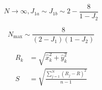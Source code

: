 \documentclass[10pt,aspectratio=43,mathserif,table]{beamer}
\begin{document}
\begin{frame}
    $$
    N\rightarrow \infty , J_{1a}\sim J_{1b}\sim 2-\frac{8}{1-J_2}
    $$

    $$
    N_{\max}\sim \frac{8}{\left( 2-J_1 \right) \left( 1-J_2 \right)}
    $$


\end{frame}

\begin{frame}
    $$
    \begin{aligned}
        R_k&=\sqrt{\hat{x}_{k}^{2}+\hat{y}_{k}^{2}}\\
        S&=\sqrt{\frac{\sum\nolimits_{j=1}^N{\left( R_j-\bar{R} \right)}^2}{n-1}}\\
    \end{aligned}
    $$
\end{frame}

\begin{frame}
    
\end{frame}
\end{document}
